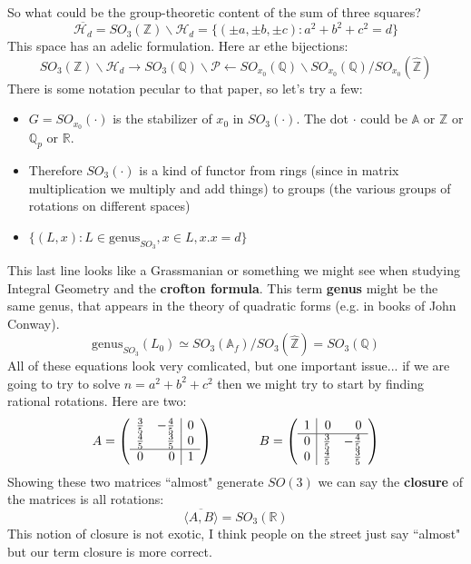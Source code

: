 \documentclass[12pt]{article}
\begin{document}
{\noindent So what could be the group-theoretic content of the sum of three squares?
$$ \overline{\mathcal{H}_d} = SO_3(\mathbb{Z}) \backslash \mathcal{H}_d = 
\{ (\pm a,\pm b,\pm c): a^2 + b^2 + c^2 = d \} $$ 
This space has an adelic formulation.  Here ar ethe bijections:
$$ SO_3(\mathbb{Z})\backslash \mathcal{H}_d \rightarrow SO_3(\mathbb{Q})\backslash \mathcal{P} \leftarrow SO_{x_0}(\mathbb{Q}) \backslash SO_{x_0}(\mathbb{Q}) / 
SO_{x_0}(\mathbb{\hat{Z}}) $$ 
There is some notation pecular to that paper, so let's try a few:
\begin{itemize}
	\item $G = SO_{x_0}(\cdot)$ is the stabilizer of $x_0$ in $SO_3(\cdot)$.  The dot $\cdot$ could be $\mathbb{A}$ or $\mathbb{Z}$ or $\mathbb{Q}_p$ or $\mathbb{R}$.
	\item Therefore $SO_3(\cdot)$ is a kind of functor from rings (since in matrix multiplication we multiply and add things) to groups (the various groups of rotations on different spaces)
	\item $\{ (L, x): L \in \mathrm{genus}_{SO_3}, x \in L, x.x = d \} $
\end{itemize}
This last line looks like a Grassmanian or something we might see when studying Integral Geometry and the \textbf{crofton formula}.  This term \textbf{genus} might be the same genus, that appears in the theory of quadratic forms (e.g. in books of John Conway).
$$ \mathrm{genus}_{SO_3}(L_0) \simeq SO_3(\mathbb{A}_f) / SO_3(\hat{\mathbb{Z}}) = SO_3(\mathbb{Q})$$ 
All of these equations look very comlicated, but one important issue... if we are going to try to solve $n = a^2  + b^2 + c^2$ then we might try to start by finding rational rotations.  Here are two:
$$A = \left( \begin{array}{cr|c}
\frac{3}{5} & -\frac{4}{5} & 0\\  
\frac{4}{5} &  \frac{3}{5} & 0\\ \hline
0  & 0  & 1\\
 \end{array} \right) \hspace{0.5in} 
 B = \left( \begin{array}{c|rr}
 1 & 0 & 0 \\ \hline
0 & \frac{3}{5} & -\frac{4}{5} \\ 
0 & \frac{4}{5} &  \frac{3}{5} \\
 \end{array} \right)
 $$
 Showing these two matrices ``almost" generate $SO(3)$ we can say the \textbf{closure} of
 the matrices is all rotations:
 $$ \overline{\langle A, B \rangle }= SO_3(\mathbb{R})$$  This notion of closure is not exotic, I think people on the street just say ``almost" but our term closure is more correct.
 \newline

}
\end{document}
